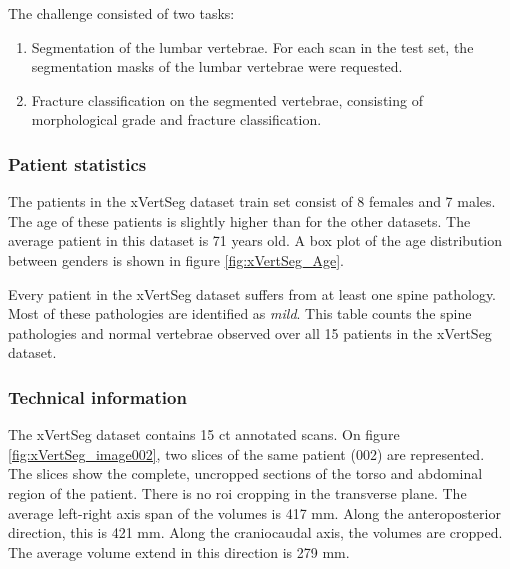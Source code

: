 The challenge consisted of two tasks:
\begin{enumerate}
    \item Segmentation of the lumbar vertebrae. For each scan in the test set, the segmentation masks of the lumbar vertebrae were requested.
    \item Fracture classification on the segmented vertebrae, consisting of morphological grade and fracture classification.
\end{enumerate}

\subsubsection{Patient statistics}

The patients in the xVertSeg dataset train set consist of 8 females and 7 males.
The age of these patients is slightly higher than for the other datasets.
The average patient in this dataset is 71 years old.
A box plot of the age distribution between genders is shown in figure \ref{fig:xVertSeg_Age}. 

\begin{table}
    \centering
        
        \caption{Every patient in the xVertSeg dataset suffers from at least one spine pathology.
        Most of these pathologies are identified as \textit{mild}.
        This table counts the spine pathologies and normal vertebrae observed over all 15 patients in the xVertSeg dataset.}   
\end{table}


\subsubsection{Technical information}

The xVertSeg dataset contains 15 \acrshort{ct} annotated scans. 
On figure \ref{fig:xVertSeg_image002}, two slices of the same patient (002) are represented.
The slices show the complete, uncropped sections of the torso and abdominal region of the patient. 
There is no \acrshort{roi} cropping in the transverse plane.
The average left-right axis span of the volumes is 417 mm. Along the anteroposterior direction, this is 421 mm. 
Along the craniocaudal axis, the volumes are cropped. The average volume extend in this direction is 279 mm.

